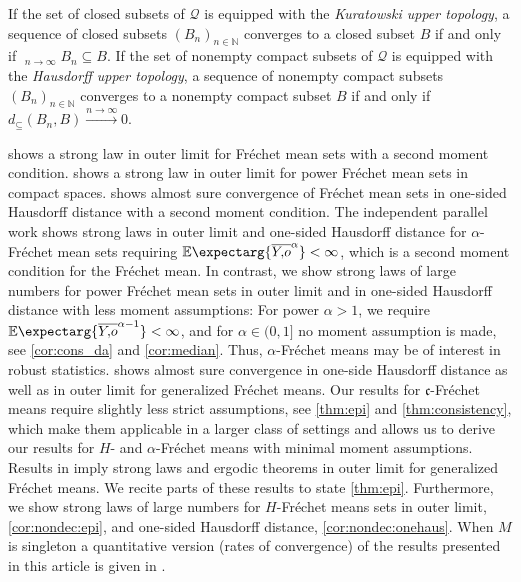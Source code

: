 \documentclass{scrartcl}
\renewcommand{\subset}{\subseteq}
\newcommand{\Ex}{\E\expectarg}
\newcommand*{\mf}[1]{\mathfrak{#1}}
\newcommand{\N}{\mathbb{N}}
\DeclareMathOperator*{\outerlim}{lim\, \overline{sup}}
\def\MS{\mathcal{Q}}\def\epi{\mathsf{epi}}\def\aec{\mathsf{aec}}\def\alsec{\mathsf{alsec}}\def\aecp{\mathsf{aec}_P}\def\Hausdorff{\mathsf{H}}\def\Haus{\mathsf{H}}\def\ubs{\mathsf{ubs}}\newcommand{\epiconv}[1]{\xrightarrow{#1\to\infty}_\epi}\newcommand{\hausconv}[1]{\xrightarrow{#1\to\infty}_\Hausdorff}\newcommand{\ubsconv}[1]{\xrightarrow{#1\to\infty}_\ubs}\newcommand{\ol}[2]{\overline{#1,\!#2}}
\theoremstyle{plain}\newtheorem{theorem}{Theorem}[section]
\theoremstyle{definition}
\theoremstyle{remark}
\begin{document}
If the set of closed subsets of $\MS$ is equipped with the \textit{Kuratowski upper topology}, a sequence of closed subsets $(B_n)_{n\in\N}$ converges to a closed subset $B$ if and only if $\outerlim_{n\to\infty} B_n \subset B$. 
If the set of nonempty compact subsets of $\MS$ is equipped with the \textit{Hausdorff upper topology}, a sequence of nonempty compact subsets $(B_n)_{n\in\N}$ converges to a nonempty compact subset $B$ if and only if $d_{\subset}(B_n, B)\xrightarrow{n\to\infty} 0$. 

\cite{ziezold77} shows a strong law in outer limit for Fréchet mean sets with a second moment condition.
\cite{sverdrup81} shows a strong law in outer limit for power Fréchet mean sets in compact spaces.
\cite{bhattacharya03} shows almost sure convergence of Fréchet mean sets in one-sided Hausdorff distance with a second moment condition.
The independent parallel work \cite{evans20} shows strong laws in outer limit and one-sided Hausdorff distance for $\alpha$-Fréchet mean sets requiring $\Ex{\ol Yo^{\alpha}} < \infty$, which is a second moment condition for the Fréchet mean.
In contrast, we show strong laws of large numbers for power Fréchet mean sets in outer limit and in one-sided Hausdorff distance with less moment assumptions: For power $\alpha>1$, we require $\Ex{\ol Yo^{\alpha-1}} < \infty$, and for $\alpha\in (0,1]$ no moment assumption is made, see \autoref{cor:cons_da} and \autoref{cor:median}. Thus, $\alpha$-Fréchet means may be of interest in robust statistics.
\cite{huckemann11} shows almost sure convergence in one-side Hausdorff distance as well as in outer limit for generalized Fréchet means. Our results for $\mf c$-Fréchet means require slightly less strict assumptions, see \autoref{thm:epi} and \autoref{thm:consistency}, which make them applicable in a larger class of settings and allows us to derive our results for $H$- and $\alpha$-Fréchet means with minimal moment assumptions.
Results in \cite{artstein95, korf01, choirat03} imply strong laws and ergodic theorems in outer limit for generalized Fréchet means. We recite parts of these results to state \autoref{thm:epi}.
Furthermore, we show strong laws of large numbers for $H$-Fréchet means sets in outer limit, \autoref{cor:nondec:epi}, and one-sided Hausdorff distance, \autoref{cor:nondec:onehaus}.
When $M$ is singleton a quantitative version (rates of convergence) of the results presented in this article is given in \cite{schoetz19}.
\end{document}
